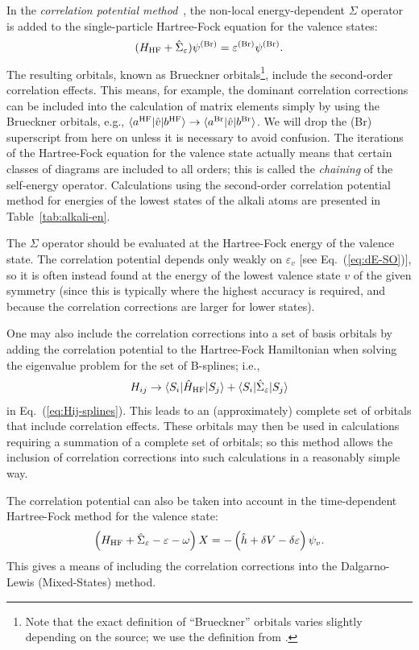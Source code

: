 \documentclass[10pt,twocolumn,a4paper]{article}%
\newcommand{\bra}[1]{\ensuremath{\langle #1|}}	%
\newcommand{\ket}[1]{\ensuremath{|#1\rangle}}	%
\newcommand{\be}{\begin{equation}}
\newcommand{\ee}{\end{equation}}
\def\en{\ensuremath{\varepsilon}}
\newcommand{\w}{\ensuremath{\omega}}
\begin{document}
In the {\em correlation potential method}~\cite{DzubaPNC1984,DzubaPNC1985}, the non-local energy-dependent $\Sigma$ operator is added to the single-particle Hartree-Fock equation for the valence states:
\be\label{eq:H-Bru}
(H_{\rm HF} + \hat \Sigma_\en)\psi^{\rm (Br)} = \en^{\rm (Br)}\psi^{\rm (Br)}.
\ee
The resulting orbitals, known as Brueckner orbitals\footnote{Note that the exact definition of ``Brueckner'' orbitals varies slightly depending on the source; we use the definition from \cite{DzubaPNC1984}.}, include the second-order correlation effects.
This means, for example, the dominant correlation corrections can be included into the calculation of matrix elements simply by using the Brueckner orbitals, e.g., $\bra{a^{\rm HF}}{\hat v}\ket{b^{\rm HF}}\to\bra{a^{\rm Br}}{\hat v}\ket{b^{\rm Br}}$.
We will drop the (Br) superscript from here on unless it is necessary to avoid confusion.
The iterations of the Hartree-Fock equation for the valence state actually means that certain classes of diagrams are included to all orders; this is called the {\em chaining} of the self-energy operator.
Calculations using the second-order correlation potential method for energies of the lowest states of the alkali atoms are presented in Table~\ref{tab:alkali-en}.



The $\Sigma$ operator should be evaluated at the Hartree-Fock energy of the valence state.
The correlation potential depends only weakly on $\en_v$ [see Eq.~(\ref{eq:dE-SO})],
so it is often instead found at the energy of the lowest valence state $v$ of the given symmetry (since this is typically where the highest accuracy is required, and because the correlation corrections are larger for lower states).




One may also include the correlation corrections into a set of basis orbitals by adding the correlation potential to the Hartree-Fock Hamiltonian when solving the eigenvalue problem for the set of B-splines; i.e.,
\be
H_{ij} \to \bra{S_i}\hat H_{\rm HF}\ket{S_j}  + \bra{S_i}\hat \Sigma_\en\ket{S_j} 
\ee
in Eq.~(\ref{eq:Hij-splines}).
This leads to an (approximately) complete set of orbitals that include correlation effects.
These orbitals may then be used in calculations requiring a summation of a complete set of orbitals; so this method allows the inclusion of correlation corrections into such calculations in a reasonably simple way.


The correlation potential can also be taken into account in the time-dependent Hartree-Fock method for the valence state:
\be
\left( H_{\rm HF} +\hat\Sigma_\en -  \en -\w \right)X = -\left(\hat h + \delta V - \delta \en \right)\psi_v.
\ee
This gives a means of including the correlation corrections into the Dalgarno-Lewis (Mixed-States) method.
\end{document}

